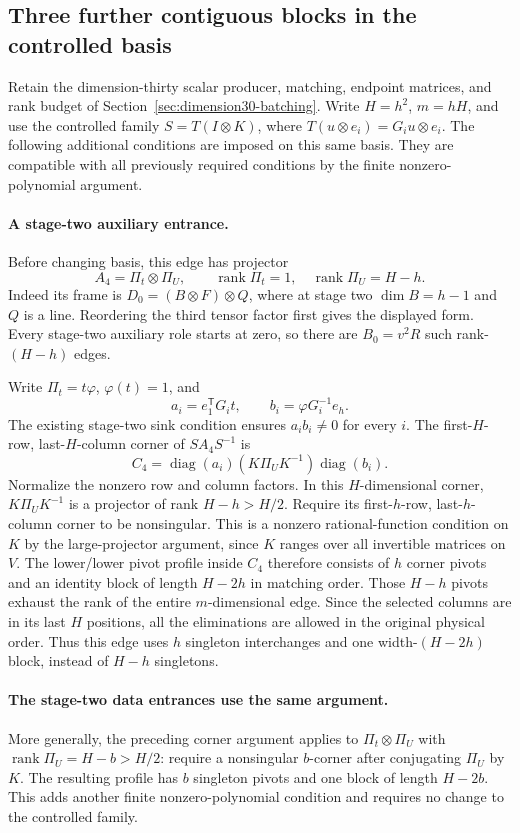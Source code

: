 \subsection{Three further contiguous blocks in the controlled basis}
\label{sec:controlled-corner-refinement}

Retain the dimension-thirty scalar producer, matching, endpoint matrices,
and rank budget of Section~\ref{sec:dimension30-batching}. Write
$H=h^2$, $m=hH$, and use the controlled family
$S=T(I\otimes K)$, where $T(u\otimes e_i)=G_i u\otimes e_i$.
The following additional conditions are imposed on this same basis.
They are compatible with all previously required conditions by the
finite nonzero-polynomial argument.

\paragraph{A stage-two auxiliary entrance.}
Before changing basis, this edge has projector
\[
 A_4=\Pi_t\otimes\Pi_U,\qquad
 \operatorname{rank}\Pi_t=1,\quad
 \operatorname{rank}\Pi_U=H-h.
\]
Indeed its frame is $D_0=(B\otimes F)\otimes Q$, where at stage two
$\dim B=h-1$ and $Q$ is a line. Reordering the third tensor factor
first gives the displayed form. Every stage-two auxiliary role starts
at zero, so there are $B_0=v^2R$ such rank-$(H-h)$ edges.

Write $\Pi_t=t\varphi$, $\varphi(t)=1$, and
\[
 a_i=e_1^{\mathsf T}G_it,\qquad b_i=\varphi G_i^{-1}e_h.
\]
The existing stage-two sink condition ensures $a_i b_i\ne0$ for every
$i$. The first-$H$-row, last-$H$-column corner of $SA_4S^{-1}$ is
\[
 C_4=\operatorname{diag}(a_i)(K\Pi_UK^{-1})\operatorname{diag}(b_i).
\]
Normalize the nonzero row and column factors. In this $H$-dimensional
corner, $K\Pi_UK^{-1}$ is a projector of rank $H-h>H/2$. Require its
first-$h$-row, last-$h$-column corner to be nonsingular. This is a
nonzero rational-function condition on $K$ by the large-projector
argument, since $K$ ranges over all invertible matrices on $V$.
The lower/lower pivot profile inside $C_4$ therefore consists of $h$
corner pivots and an identity block of length $H-2h$ in matching order.
Those $H-h$ pivots exhaust the rank of the entire $m$-dimensional edge.
Since the selected columns are in its last $H$ positions, all the
eliminations are allowed in the original physical order. Thus this
edge uses $h$ singleton interchanges and one width-$(H-2h)$ block,
instead of $H-h$ singletons.

\paragraph{The stage-two data entrances use the same argument.}
More generally, the preceding corner argument applies to
$\Pi_t\otimes\Pi_U$ with $\operatorname{rank}\Pi_U=H-b>H/2$:
require a nonsingular $b$-corner after conjugating $\Pi_U$ by $K$.
The resulting profile has $b$ singleton pivots and one block of
length $H-2b$. This adds another finite nonzero-polynomial condition
and requires no change to the controlled family.

